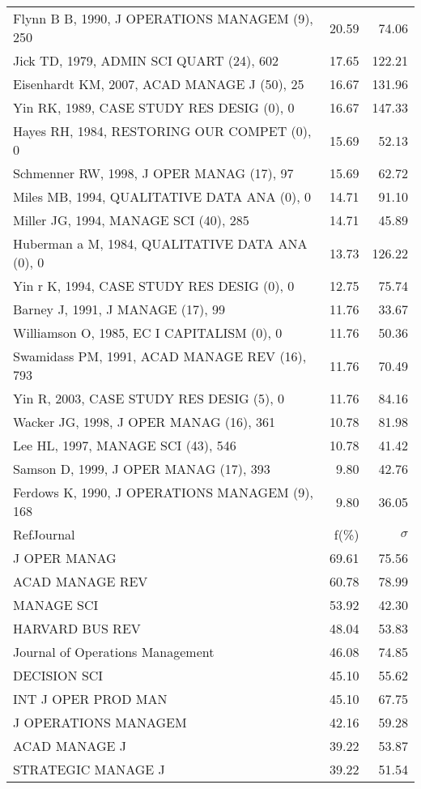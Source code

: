 \documentclass[a4paper,11pt]{report}
\begin{document}
\begin{landscape}
\begin{table}[!ht]
{\begin{tabular}{|l r r|}
Flynn B B, 1990, J OPERATIONS MANAGEM (9), 250 & 20.59 & 74.06\\
Jick TD, 1979, ADMIN SCI QUART (24), 602 & 17.65 & 122.21\\
Eisenhardt KM, 2007, ACAD MANAGE J (50), 25 & 16.67 & 131.96\\
Yin RK, 1989, CASE STUDY RES DESIG (0), 0 & 16.67 & 147.33\\
Hayes RH, 1984, RESTORING OUR COMPET (0), 0 & 15.69 & 52.13\\
Schmenner RW, 1998, J OPER MANAG (17), 97 & 15.69 & 62.72\\
Miles MB, 1994, QUALITATIVE DATA ANA (0), 0 & 14.71 & 91.10\\
Miller JG, 1994, MANAGE SCI (40), 285 & 14.71 & 45.89\\
Huberman a M, 1984, QUALITATIVE DATA ANA (0), 0 & 13.73 & 126.22\\
Yin r K, 1994, CASE STUDY RES DESIG (0), 0 & 12.75 & 75.74\\
Barney J, 1991, J MANAGE (17), 99 & 11.76 & 33.67\\
Williamson O, 1985, EC I CAPITALISM (0), 0 & 11.76 & 50.36\\
Swamidass PM, 1991, ACAD MANAGE REV (16), 793 & 11.76 & 70.49\\
Yin R, 2003, CASE STUDY RES DESIG (5), 0 & 11.76 & 84.16\\
Wacker JG, 1998, J OPER MANAG (16), 361 & 10.78 & 81.98\\
Lee HL, 1997, MANAGE SCI (43), 546 & 10.78 & 41.42\\
Samson D, 1999, J OPER MANAG (17), 393 & 9.80 & 42.76\\
Ferdows K, 1990, J OPERATIONS MANAGEM (9), 168 & 9.80 & 36.05\\
\hline
\hline
RefJournal & f(\%) & $\sigma$\\
\hline
J OPER MANAG & 69.61 & 75.56\\
ACAD MANAGE REV & 60.78 & 78.99\\
MANAGE SCI & 53.92 & 42.30\\
HARVARD BUS REV & 48.04 & 53.83\\
Journal of Operations Management & 46.08 & 74.85\\
DECISION SCI & 45.10 & 55.62\\
INT J OPER PROD MAN & 45.10 & 67.75\\
J OPERATIONS MANAGEM & 42.16 & 59.28\\
ACAD MANAGE J & 39.22 & 53.87\\
STRATEGIC MANAGE J & 39.22 & 51.54\\
\hline
\end{tabular}
}
\end{table}


\end{landscape}
\end{document}
